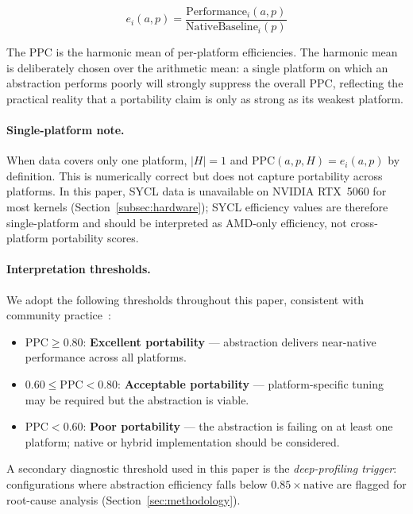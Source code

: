 \begin{equation}
    e_i(a, p) = \frac{\text{Performance}_i(a, p)}{\text{NativeBaseline}_i(p)}
    \label{eq:efficiency}
\end{equation}

The PPC is the harmonic mean of per-platform efficiencies. The harmonic mean
is deliberately chosen over the arithmetic mean: a single platform on which
an abstraction performs poorly will strongly suppress the overall PPC,
reflecting the practical reality that a portability claim is only as strong
as its weakest platform.

\paragraph{Single-platform note.}
When data covers only one platform, $|H| = 1$ and PPC$(a, p, H) = e_i(a, p)$
by definition. This is numerically correct but does not capture portability
across platforms. In this paper, SYCL data is unavailable on NVIDIA RTX~5060
for most kernels (Section~\ref{subsec:hardware}); SYCL efficiency values
are therefore single-platform and should be interpreted as AMD-only efficiency,
not cross-platform portability scores.

\paragraph{Interpretation thresholds.}
We adopt the following thresholds throughout this paper, consistent with
community practice~\cite{Pennycook2019}:

\begin{itemize}
    \item $\text{PPC} \geq 0.80$: \textbf{Excellent portability} --- abstraction
    delivers near-native performance across all platforms.
    \item $0.60 \leq \text{PPC} < 0.80$: \textbf{Acceptable portability} ---
    platform-specific tuning may be required but the abstraction is viable.
    \item $\text{PPC} < 0.60$: \textbf{Poor portability} --- the abstraction
    is failing on at least one platform; native or hybrid implementation
    should be considered.
\end{itemize}

A secondary diagnostic threshold used in this paper is the \emph{deep-profiling
trigger}: configurations where abstraction efficiency falls below
$0.85 \times \text{native}$ are flagged for root-cause analysis
(Section~\ref{sec:methodology}).

